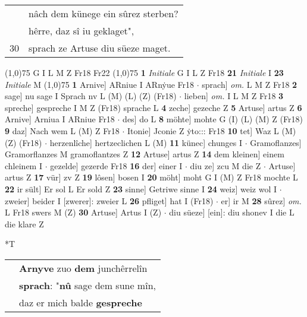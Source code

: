 \documentclass[8pt,a4paper,notitlepage]{article}
\begin{document}
\begin{table}[ht]
\begin{minipage}[t]{0.5\linewidth}
\begin{tabular}{rl}
 & nâch dem künege ein sûrez sterben?\\ 
 & hêrre, daz sî iu geklaget",\\ 
30 & sprach ze Artuse diu süeze maget.\\ 
\end{tabular}
\scriptsize
\line(1,0){75} \newline
G I L M Z Fr18 Fr22 \newline
\line(1,0){75} \newline
\textbf{1} \textit{Initiale} G I L Z Fr18  \textbf{21} \textit{Initiale} I  \textbf{23} \textit{Initiale} M  \newline
\line(1,0){75} \newline
\textbf{1} Arnive] ARniue I ARnẏue Fr18  $\cdot$ sprach] \textit{om.} L M Z Fr18 \textbf{2} sage] nu sage I Sprach nv L (M) (L) (Z) (Fr18)  $\cdot$ lieben] \textit{om.} I L M Z Fr18 \textbf{3} spreche] gespreche I M Z (Fr18) sprache L \textbf{4} zeche] gezeche Z \textbf{5} Artuse] artus Z \textbf{6} Arnive] Arniua I ARniue Fr18  $\cdot$ des] do L \textbf{8} möhte] mohte G (I) (L) (M) Z (Fr18) \textbf{9} daz] Nach wem L (M) Z Fr18  $\cdot$ Itonie] Jconie Z ẏto::: Fr18 \textbf{10} tet] Waz L (M) (Z) (Fr18)  $\cdot$ herzenlîche] hertzeclichen L (M) \textbf{11} künec] chunges I  $\cdot$ Gramoflanzes] Gramorflanzes M gramoflantzes Z \textbf{12} Artuse] artus Z \textbf{14} dem kleinen] einem chleinem I  $\cdot$ gezelde] gezerde Fr18 \textbf{16} der] einer I  $\cdot$ diu ze] zcu M die Z  $\cdot$ Artuse] artus Z \textbf{17} vür] zv Z \textbf{19} lôsen] bosen I \textbf{20} möht] moht G I (M) Z Fr18 mochte L \textbf{22} ir sült] Er sol L Er sold Z \textbf{23} sinne] Getriwe sinne I \textbf{24} weiz] weiz wol I  $\cdot$ zweier] beider I [zwerer]: zweier L \textbf{26} pfliget] hat I (Fr18)  $\cdot$ er] ir M \textbf{28} sûrez] \textit{om.} L Fr18 swers M (Z) \textbf{30} Artuse] Artus I (Z)  $\cdot$ diu süeze] [ein]: diu shonev I die L die klare Z \newline
\end{minipage}
\hspace{0.5cm}
\begin{minipage}[t]{0.5\linewidth}
\small
\begin{center}*T
\end{center}
\begin{tabular}{rl}
 & \textbf{Arnyve} zuo \textbf{dem} junchêrrelîn\\ 
 & \textbf{sprach}: "\textbf{nû} sage dem sune mîn,\\ 
 & daz er mich balde \textbf{gespreche}\\ 

\end{tabular}
\end{minipage}
\end{table}
\end{document}
